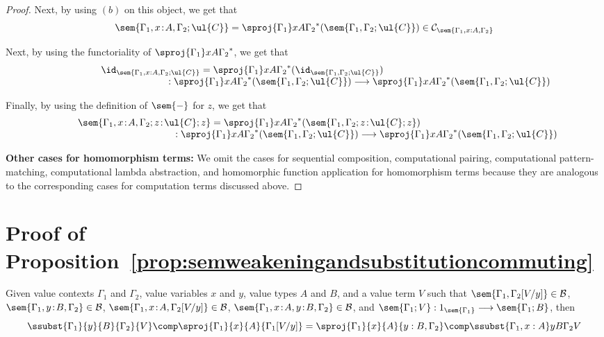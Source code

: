 \begin{proof}
Next, by using $(b)$ on this object, we get that
\[
\sem{\Gamma_1, x \!:\! A, \Gamma_2; \ul{C}} = \sproj {\Gamma_1} x A {\Gamma_2}^*(\sem{\Gamma_1,\Gamma_2;\ul{C}}) \in \mathcal{C}_{\sem{\Gamma_1, x : A,\Gamma_2}}
\]

Next, by using the functoriality of $\sproj {\Gamma_1} x A {\Gamma_2}^*$, we get that
\[
\begin{array}{c}
\hspace{-4.5cm}
\id_{\sem{\Gamma_1, x : A, \Gamma_2; \ul{C}}} 
=
\sproj {\Gamma_1} x A {\Gamma_2}^*(\id_{\sem{\Gamma_1,\Gamma_2;\ul{C}}})
\\
\hspace{4cm}
: \sproj {\Gamma_1} x A {\Gamma_2}^*(\sem{\Gamma_1,\Gamma_2;\ul{C}}) \longrightarrow \sproj {\Gamma_1} x A {\Gamma_2}^*(\sem{\Gamma_1,\Gamma_2;\ul{C}})
\end{array}
\]

Finally, by using the definition of $\sem{-}$ for $z$, we get that
\[
\begin{array}{c}
\hspace{-4cm}
\sem{\Gamma_1, x \!:\! A,\Gamma_2;z \!:\! \ul{C};z} = \sproj {\Gamma_1} x A {\Gamma_2}^*(\sem{\Gamma_1,\Gamma_2;z \!:\! \ul{C};z}) 
\\
\hspace{4.5cm}
: \sproj {\Gamma_1} x A {\Gamma_2}^*(\sem{\Gamma_1,\Gamma_2;\ul{C}}) \longrightarrow \sproj {\Gamma_1} x A {\Gamma_2}^*(\sem{\Gamma_1,\Gamma_2;\ul{C}})
\end{array}
\]

\vspace{0.1cm}
\noindent
\textbf{Other cases for homomorphism terms:}
We omit the cases for sequential composition, computational pairing, computational pattern-matching, computational lambda abstraction, and homomorphic function application for homomorphism terms because they are analogous to the corresponding cases for computation terms discussed above. 
\end{proof}

\newpage

\section{Proof of Proposition~\ref{prop:semweakeningandsubstitutioncommuting}}
\label{sect:proofofprop:semweakeningandsubstitutioncommuting}

{
\renewcommand{\thetheorem}{\ref{prop:semweakeningandsubstitutioncommuting}}
\begin{proposition}
Given value contexts $\Gamma_1$ and $\Gamma_2$, value variables $x$ and $y$, value types $A$ and $B$, and a value term $V$ such that $\sem{\Gamma_1,\Gamma_2[V/y]} \in \mathcal{B}$, $\sem{\Gamma_1, y \!:\! B, \Gamma_2} \in \mathcal{B}$, $\sem{\Gamma_1, x \!:\! A,\Gamma_2[V/y]} \in \mathcal{B}$, $\sem{\Gamma_1, x \!:\! A, y \!:\! B,\Gamma_2} \in \mathcal{B}$, and $\sem{\Gamma_1; V} : 1_{\sem{\Gamma_1}} \longrightarrow \sem{\Gamma_1;B}$, then 
\[
\ssubst {\Gamma_1} {y} {B} {\Gamma_2} {V} \comp \sproj {\Gamma_1} {x} {A} {\Gamma_1[V/y]}
=
\sproj {\Gamma_1} {x} {A} {y : B, \Gamma_2} \comp \ssubst {\Gamma_1, x : A} y B {\Gamma_2} V 
\]
\end{proposition}
\addtocounter{theorem}{-1}
}

